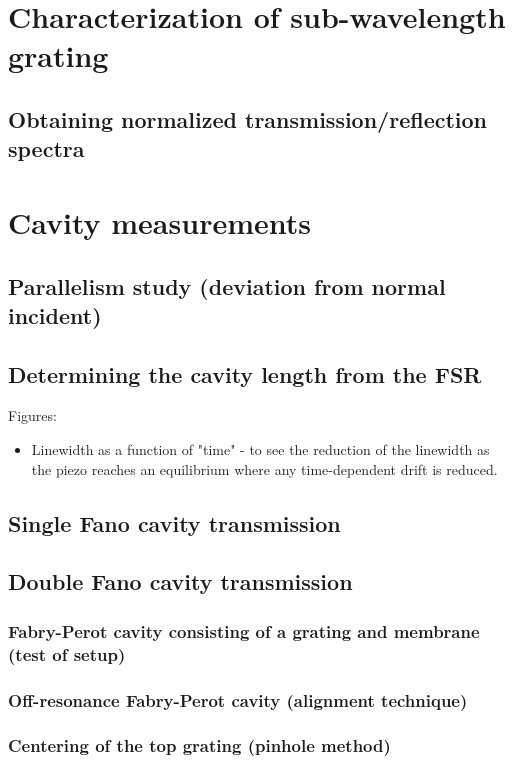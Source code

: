 \section{Characterization of sub-wavelength grating}

\subsection{Obtaining normalized transmission/reflection spectra}

\section{Cavity measurements}

\subsection{Parallelism study (deviation from normal incident)}

\subsection{Determining the cavity length from the FSR}

Figures: 
\begin{itemize}
    \item Linewidth as a function of "time" - to see the reduction of the linewidth as the piezo reaches an equilibrium where any time-dependent drift is reduced. 
\end{itemize}

\subsection{Single Fano cavity transmission} 

\subsection{Double Fano cavity transmission}

\subsubsection{Fabry-Perot cavity consisting of a grating and membrane (test of setup)}

\subsubsection{Off-resonance Fabry-Perot cavity (alignment technique)}

\subsubsection{Centering of the top grating (pinhole method)}
